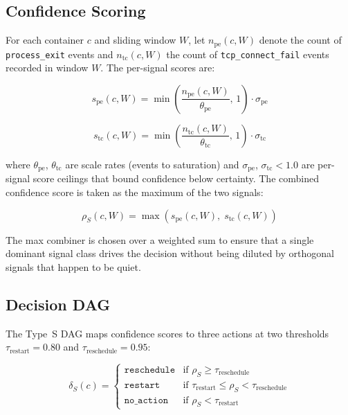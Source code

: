 \documentclass[runningheads]{llncs}
\begin{document}
\subsection{Confidence Scoring}

For each container $c$ and sliding window $W$, let $n_{\mathrm{pe}}(c,W)$
denote the count of \texttt{process\_exit} events and
$n_{\mathrm{tc}}(c,W)$ the count of \texttt{tcp\_connect\_fail} events
recorded in window $W$. The per-signal scores are:

\begin{equation}
s_{\mathrm{pe}}(c,W) = \min\!\left(\frac{n_{\mathrm{pe}}(c,W)}{\theta_{\mathrm{pe}}},\,1\right) \cdot \sigma_{\mathrm{pe}}
\label{eq:spe}
\end{equation}

\begin{equation}
s_{\mathrm{tc}}(c,W) = \min\!\left(\frac{n_{\mathrm{tc}}(c,W)}{\theta_{\mathrm{tc}}},\,1\right) \cdot \sigma_{\mathrm{tc}}
\label{eq:stc}
\end{equation}

where $\theta_{\mathrm{pe}}$, $\theta_{\mathrm{tc}}$ are scale
rates (events to saturation) and $\sigma_{\mathrm{pe}}$,
$\sigma_{\mathrm{tc}} < 1.0$ are per-signal score ceilings that bound
confidence below certainty. The combined confidence score is taken as
the maximum of the two signals:

\begin{equation}
\rho_S(c,W) = \max\!\left(s_{\mathrm{pe}}(c,W),\; s_{\mathrm{tc}}(c,W)\right)
\label{eq:rhos}
\end{equation}

The max combiner is chosen over a weighted sum to ensure that a single
dominant signal class drives the decision without being diluted by
orthogonal signals that happen to be quiet.

\subsection{Decision DAG}

The Type~S DAG maps confidence scores to three actions at two thresholds
$\tau_{\mathrm{restart}} = 0.80$ and $\tau_{\mathrm{reschedule}} = 0.95$:

\[
\delta_S(c) = \begin{cases}
\texttt{reschedule} & \text{if } \rho_S \geq \tau_{\mathrm{reschedule}}\\
\texttt{restart}    & \text{if } \tau_{\mathrm{restart}} \leq \rho_S < \tau_{\mathrm{reschedule}}\\
\texttt{no\_action} & \text{if } \rho_S < \tau_{\mathrm{restart}}
\end{cases}
\]
\end{document}
